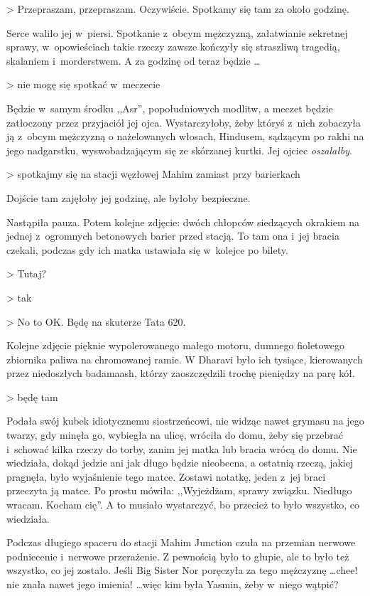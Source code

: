 \documentclass[oneside,polish,11pt,rmheadings]{mwbk}
\begin{document}
{\textgreater} Przepraszam, przepraszam. Oczywiście. Spotkamy się tam za około godzinę.

Serce waliło jej w~piersi. Spotkanie z~obcym mężczyzną, załatwianie sekretnej sprawy, w~opowieściach takie rzeczy zawsze kończyły się straszliwą tragedią, skalaniem i~morderstwem. A za godzinę od teraz będzie \ldots 

{\textgreater} nie mogę się spotkać w~meczecie

Będzie w~samym środku ,,Asr'', popołudniowych modlitw, a meczet będzie zatłoczony przez przyjaciół jej ojca. Wystarczyłoby, żeby któryś z~nich zobaczyła ją z~obcym mężczyzną o nażelowanych włosach, Hindusem, sądzącym po rakhi na jego nadgarstku, wyswobadzającym się ze skórzanej kurtki. Jej ojciec \textit{oszalałby}.

{\textgreater} spotkajmy się na stacji węzłowej Mahim zamiast przy barierkach

Dojście tam zajęłoby jej godzinę, ale byłoby bezpieczne.

Nastąpiła pauza. Potem kolejne zdjęcie: dwóch chłopców siedzących okrakiem na jednej z~ogromnych betonowych barier przed stacją. To tam ona i~jej bracia czekali, podczas gdy ich matka ustawiała się w~kolejce po bilety.

{\textgreater} Tutaj?

{\textgreater} tak

{\textgreater} No to OK. Będę na skuterze Tata 620.

Kolejne zdjęcie pięknie wypolerowanego małego motoru, dumnego fioletowego zbiornika paliwa na chromowanej ramie. W Dharavi było ich tysiące, kierowanych przez niedoszłych badamaash, którzy zaoszczędzili trochę pieniędzy na parę kół.

{\textgreater} będę tam

Podała swój kubek idiotycznemu siostrzeńcowi, nie widząc nawet grymasu na jego twarzy, gdy minęła go, wybiegła na ulicę, wróciła do domu, żeby się przebrać i~schować kilka rzeczy do torby, zanim jej matka lub bracia wrócą do domu. Nie wiedziała, dokąd jedzie ani jak długo będzie nieobecna, a ostatnią rzeczą, jakiej pragnęła, było wyjaśnienie tego matce. Zostawi notatkę, jeden z~jej braci przeczyta ją matce. Po prostu mówiła: ,,Wyjeżdżam, sprawy związku. Niedługo wracam. Kocham cię''. A to musiało wystarczyć, bo przecież to było wszystko, co wiedziała.

Podczas długiego spaceru do stacji Mahim Junction czuła na przemian nerwowe podniecenie i~nerwowe przerażenie. Z pewnością było to głupie, ale to było też wszystko, co jej zostało. Jeśli Big Sister Nor poręczyła za tego mężczyznę  \ldots  chee! nie znała nawet jego imienia!  \ldots  więc kim była Yasmin, żeby w~niego wątpić?
\end{document}
